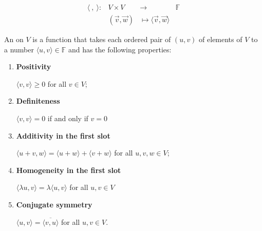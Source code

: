 \documentclass[11pt,fleqn]{book} %
\begin{document}
\setcounter{section}{0}
\setcounter{definitionT}{1}
\begin{definition}
    $$\begin{matrix} \langle~,~\rangle: &V \times V &\to &\mathbb{F} \\ &(\vec{v}, \vec{w}) &\mapsto \langle \vec{v}, \vec{w} \rangle \end{matrix}$$

    An  on $V$ is a function that takes each ordered pair of $(u, v)$ of elements of $V$ to a number $\langle u, v \rangle \in \mathbb{F}$ and has the following properties:
    
    \begin{enumerate}[label=\alph*)]
        \item \textbf{Positivity}
        
        $\langle v, v \rangle \ge 0$ for all $v \in V$;
        
        \item \textbf{Definiteness}
        
        $\langle v, v \rangle = 0$ if and only if $v = 0$
        
        \item \textbf{Additivity in the first slot}

        $\langle u + v, w \rangle = \langle u + w \rangle + \langle v + w \rangle$ for all $u, v, w \in V$;
        
        \item \textbf{Homogeneity in the first slot}

        $\langle \lambda u, v \rangle = \lambda\langle u, v\rangle$ for all $u, v \in V$
        
        \item \textbf{Conjugate symmetry}
        
        $\langle u, v \rangle = \overline{\langle v, u \rangle}$ for all $u, v \in V$.
    \end{enumerate}
\end{definition}
\setcounter{section}{3}
\end{document}
